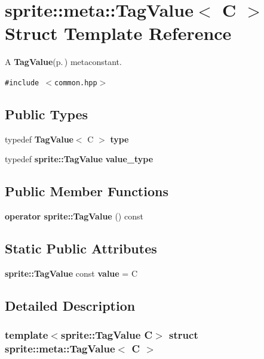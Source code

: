 \section{sprite::meta::Tag\-Value$<$ C $>$ Struct Template Reference}
\label{structsprite_1_1meta_1_1TagValue}
A {\bf Tag\-Value}{\rm (p.\,\pageref{structsprite_1_1meta_1_1TagValue})} metaconstant.  


{\tt \#include $<$common.hpp$>$}

\subsection*{Public Types}
\begin{CompactItemize}
\item 
typedef {\bf Tag\-Value}$<$ C $>$ {\bf type}\label{structsprite_1_1meta_1_1TagValue_w0}

\item 
typedef {\bf sprite::Tag\-Value} {\bf value\_\-type}\label{structsprite_1_1meta_1_1TagValue_w1}

\end{CompactItemize}
\subsection*{Public Member Functions}
\begin{CompactItemize}
\item 
{\bf operator sprite::Tag\-Value} () const \label{structsprite_1_1meta_1_1TagValue_a0}

\end{CompactItemize}
\subsection*{Static Public Attributes}
\begin{CompactItemize}
\item 
{\bf sprite::Tag\-Value} const {\bf value} = C\label{structsprite_1_1meta_1_1TagValue_s0}

\end{CompactItemize}


\subsection{Detailed Description}
\subsubsection*{template$<$sprite::Tag\-Value C$>$ struct sprite::meta::Tag\-Value$<$ C $>$}

